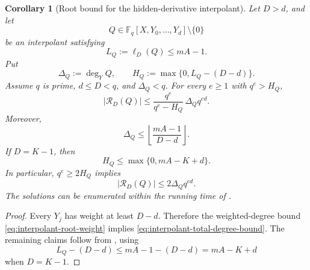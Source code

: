 \documentclass[11pt,letterpaper]{article}
\newtheorem{corollary}[corollary]{Corollary}
\theoremstyle{definition}
\newcommand{\F}{\mathbb{F}}
\begin{document}
\begin{corollary}[Root bound for the hidden-derivative interpolant]
\label{cor:interpolant-root-bound}
Let \(D>d\), and let
\[
  Q\in\F_q[X,Y_0,\ldots,Y_d]\setminus\{0\}
\]
be an interpolant satisfying
\begin{equation}
  L_Q:=\ell_D(Q)\le mA-1.
  \label{eq:interpolant-root-weight}
\end{equation}
Put
\begin{equation}
  \Delta_Q:=\deg_YQ,
  \qquad
  H_Q:=\max\{0,L_Q-(D-d)\}.
  \label{eq:interpolant-root-parameters}
\end{equation}
Assume \(q\) is prime, \(d\le D<q\), and \(\Delta_Q<q\).  For every
\(e\ge1\) with \(q^e>H_Q\),
\begin{equation}
  |\mathcal R_D(Q)|
  \le
  \frac{q^e}{q^e-H_Q}\,\Delta_Qq^{ed}.
  \label{eq:interpolant-root-list-bound}
\end{equation}
Moreover,
\begin{equation}
  \Delta_Q
  \le
  \left\lfloor\frac{mA-1}{D-d}\right\rfloor.
  \label{eq:interpolant-total-degree-bound}
\end{equation}
If \(D=K-1\), then
\begin{equation}
  H_Q\le\max\{0,mA-K+d\}.
  \label{eq:interpolant-separant-bound}
\end{equation}
In particular, \(q^e\ge2H_Q\) implies
\begin{equation}
  |\mathcal R_D(Q)|\le2\Delta_Qq^{ed}.
  \label{eq:interpolant-root-list-bound-two}
\end{equation}
The solutions can be enumerated within the running time of
.
\end{corollary}

\begin{proof}
Every \(Y_j\) has weight at least \(D-d\).  Therefore the weighted-degree
bound \eqref{eq:interpolant-root-weight} implies
\eqref{eq:interpolant-total-degree-bound}.  The remaining claims follow from
, using
\[
  L_Q-(D-d)\le mA-1-(D-d)=mA-K+d
\]
when \(D=K-1\).
\end{proof}
\end{document}
